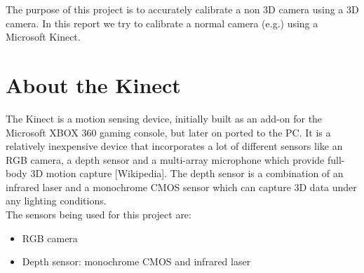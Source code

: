 The purpose of this project is to accurately calibrate a non 3D camera using a 3D camera. In this report we try to calibrate a normal camera (e.g.) using a Microsoft Kinect. \\

\section{About the Kinect}

The Kinect is a motion sensing device, initially built as an add-on for the Microsoft XBOX 360 gaming console, but later on ported to the PC. It is a relatively inexpensive device that incorporates a lot of different sensors like an RGB camera, a depth sensor and a multi-array microphone which provide full-body 3D motion capture [Wikipedia]. The depth sensor is a combination of an infrared laser and a monochrome CMOS sensor which can capture 3D data under any lighting conditions. \\
The sensors being used for this project are:

\begin{itemize}
	\item RGB camera
	\item Depth sensor: monochrome CMOS and infrared laser
\end{itemize}

